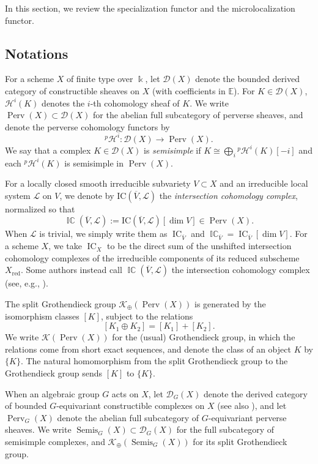 \documentclass[11pt]{amsart}
\numberwithin{equation}{section}
\theoremstyle{definition}
\def\lra{\longrightarrow }
\DeclareMathOperator{\Perv}{\mathrm{Perv}}
\DeclareMathOperator{\IC}{\mathrm{IC}}
\DeclareMathOperator{\ICperv}{\mathbb{IC}}
\DeclareMathOperator{\Semis}{Semis}
\def\cH{\mathcal {H}}
\def\EE{\mathbb{E}}
\begin{document}
In this section, we review the specialization functor and the microlocalization functor.
\subsection{Notations} \label{ss notations}
For a scheme $X$ of finite type over $\Bbbk$, let $\mathscr D(X)$ denote the bounded derived category of constructible sheaves on $X$ (with coefficients in $\EE$).
For $K\in\mathscr D(X)$, $\cH^i(K)$ denotes the $i$-th cohomology sheaf of $K$.
We write $\Perv(X) \subset \mathscr D(X)$ for the abelian full subcategory of perverse sheaves, and denote the perverse cohomology functors by
\[{}^p\cH^i : \mathscr D(X) \lra \Perv(X).\]
We say that a complex $K \in \mathscr D(X)$ is \emph{semisimple} if
$K \cong \bigoplus_i {}^p\cH^i(K)[-i]$
and each ${}^p\cH^i(K)$ is semisimple in $\Perv(X)$.


For a locally closed smooth irreducible subvariety $V \subset X$ and an irreducible local system $\mathcal L$ on $V$, we denote by
$\mathrm{IC}(\overline V, \mathcal L)$
the \emph{intersection cohomology complex}, normalized so that
\[\ICperv(\overline V,\mathcal L):=\mathrm{IC}(\overline V, \mathcal L)[\dim V]\in \Perv(X).\]
When $\mathcal L$ is trivial, we simply write them as $\IC_{\overline V}$ and $\ICperv_{\overline V}=\IC_{\overline V}[\dim V]$.
For a scheme $X$, we take $\IC_X$ to be the direct sum of the unshifted intersection cohomology complexes of the irreducible components of its reduced subscheme $X_{\mathrm{red}}$.
Some authors instead call $\ICperv(\overline V,\mathcal L)$ the intersection cohomology complex (see, e.g., \cite{Achar,D04,M19}).

The split Grothendieck group $\mathscr K_\oplus(\Perv(X))$ is generated by the isomorphism classes $[K]$, subject to the relations
\[[K_1 \oplus K_2] = [K_1] + [K_2].\]
We write $\mathscr K(\Perv(X))$ for the (usual) Grothendieck group, in which the relations come from short exact sequences, and denote the class of an object $K$ by $\{K\}$.
The natural homomorphism from the split Grothendieck group to the Grothendieck group sends $[K]$ to $\{K\}$.

\medskip
When an algebraic group $G$ acts on $X$,  let $\mathscr D_G(X)$ denote the derived category of bounded $G$-equivariant constructible complexes on $X$ \cite{bernstein-lunts,Joshua} (see also \cite[Definition 6.4.4]{Achar}), and let $\Perv_G(X)$ denote the abelian full subcategory of $G$-equivariant perverse sheaves. 
We write $\Semis_G(X)\subset \mathscr D_G(X)$ for the full subcategory of semisimple complexes, and $\mathscr K_{\oplus}(\Semis_G(X))$ for its split Grothendieck group.
\end{document}
